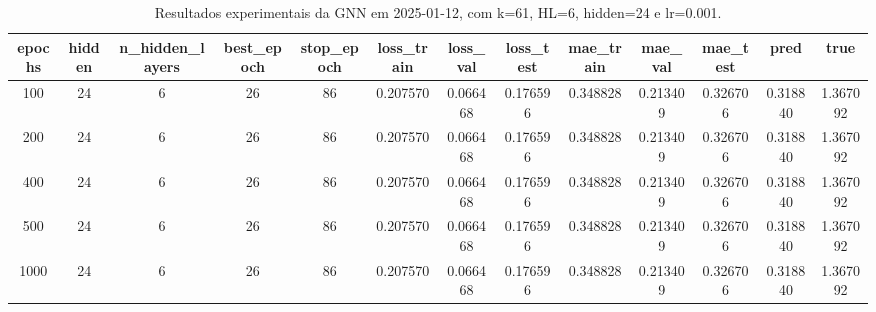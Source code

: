 \begin{table}[h]
\centering
\caption{Resultados experimentais da GNN em 2025-01-12, com k=61, HL=6, hidden=24 e lr=0.001.}
\label{tab:gnn_results_k61_hl6_h24_d20250112}
\begin{tabular}{ccccccccccccc}
\toprule
epochs & hidden & n\_hidden\_layers & best\_epoch & stop\_epoch & loss\_train & loss\_val & loss\_test & mae\_train & mae\_val & mae\_test & pred & true \\
\midrule
100 & 24 & 6 & 26 & 86 & 0.207570 & 0.066468 & 0.176596 & 0.348828 & 0.213409 & 0.326706 & 0.318840 & 1.367092 \\
200 & 24 & 6 & 26 & 86 & 0.207570 & 0.066468 & 0.176596 & 0.348828 & 0.213409 & 0.326706 & 0.318840 & 1.367092 \\
400 & 24 & 6 & 26 & 86 & 0.207570 & 0.066468 & 0.176596 & 0.348828 & 0.213409 & 0.326706 & 0.318840 & 1.367092 \\
500 & 24 & 6 & 26 & 86 & 0.207570 & 0.066468 & 0.176596 & 0.348828 & 0.213409 & 0.326706 & 0.318840 & 1.367092 \\
1000 & 24 & 6 & 26 & 86 & 0.207570 & 0.066468 & 0.176596 & 0.348828 & 0.213409 & 0.326706 & 0.318840 & 1.367092 \\
\bottomrule
\end{tabular}
\end{table}
